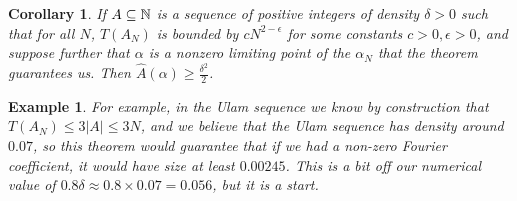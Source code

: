 \documentclass{report}
\newtheorem{corollary}{Corollary}[theorem]
\newtheorem{example}{Example}
\theoremstyle{remark}
\numberwithin{equation}{section}
\begin{document}
\begin{corollary}\label{thm:alpha}
  If $A \subseteq \mathbb{N}$ is a sequence of positive integers of density
  $\delta > 0$ such that for all $N$, $T(A_N)$ is bounded by
  $c N^{2-\epsilon}$ for some constants $c > 0, \epsilon > 0$, and
  suppose further that $\alpha$ is a nonzero limiting point of the
  $\alpha_N$ that the theorem guarantees us.  Then
  $\widehat{A}(\alpha) \geq \frac{\delta^2}{2}$.
\end{corollary}

\begin{example}
  For example, in the Ulam sequence we know by construction that
  $T(A_N) \leq 3|A| \leq 3N$, and we believe that the Ulam sequence
  has density around $0.07$, so this theorem would guarantee that if
  we had a non-zero Fourier coefficient, it would have size at least
  $0.00245$.  This is a bit off our numerical value of
  $0.8\delta \approx 0.8 \times 0.07 = 0.056$, but it is a start.
\end{example}
\end{document}
